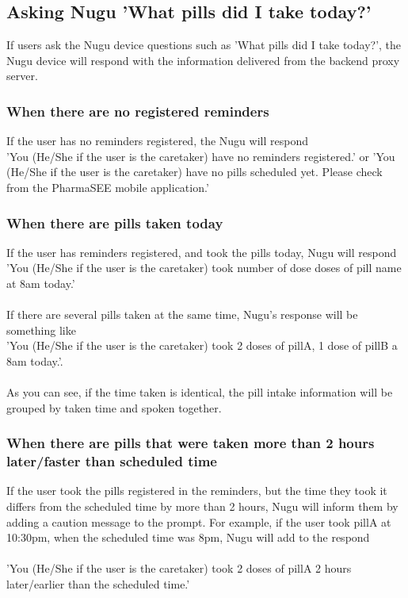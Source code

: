 \documentclass[conference]{IEEEtran}
\begin{document}
\subsection{Asking Nugu 'What pills did I take today?'}
If users ask the Nugu device questions such as 'What pills did I take today?', the Nugu device will respond with the information delivered from the backend proxy server.\\

\subsubsection{When there are no registered reminders}
If the user has no reminders registered, the Nugu will respond \\ 
'You (He/She if the user is the caretaker) have no reminders registered.' or 'You (He/She if the user is the caretaker) have no pills scheduled yet. Please check from the PharmaSEE mobile application.'\\

\subsubsection{When there are pills taken today}
If the user has reminders registered, and took the pills today, Nugu will respond \\ 
'You (He/She if the user is the caretaker) took {number of dose} doses of {pill name} at 8am today.' \\ \\
If there are several pills taken at the same time, Nugu's response will be something like \\ 
'You (He/She if the user is the caretaker) took 2 doses of pillA, 1 dose of pillB a 8am today.'. \\ \\
As you can see, if the time taken is identical, the pill intake information will be grouped by taken time and spoken together.\\

\subsubsection{When there are pills that were taken more than 2 hours later/faster than scheduled time}
If the user took the pills registered in the reminders, but the time they took it differs from the scheduled time by more than 2 hours, Nugu will inform them by adding a caution message to the prompt. For example, if the user took pillA at 10:30pm, when the scheduled time was 8pm, Nugu will add to the respond \\ \\
'You (He/She if the user is the caretaker) took 2 doses of pillA 2 hours later/earlier than the scheduled time.'
\end{document}

